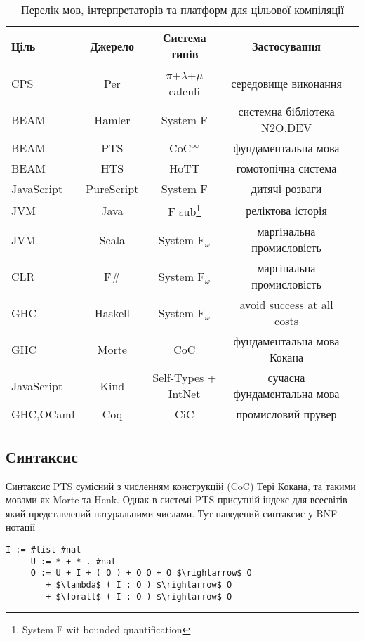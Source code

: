 \begin{table}[h]
\begin{center}
\caption{Перелік мов, інтерпретаторів та платформ для цільової компіляції}
\begin{tabular}{lcccc}
\hline
\textbf{Ціль} & \textbf{Джерело} & \textbf{Система типів} & \textbf{Застосування}\\
\hline
\rowcolor{LightGray}
CPS        & Per      & $\pi$+$\lambda$+$\mu$ calculi & середовище виконання \\
\rowcolor{LightGray}
BEAM       & Hamler     & System F            & системна бібліотека N2O.DEV \\
\rowcolor{LightGray}
BEAM       & PTS        & CoC$^\infty$        & фундаментальна мова \\
\rowcolor{LightGray}
BEAM       & HTS        & HoTT                & гомотопічна система \\
\hline
JavaScript & PureScript & System F & дитячі розваги \\
JVM        & Java       & F-sub\footnote{System F wit bounded quantification} & реліктова історія \\
JVM        & Scala      & System F$_\omega$   & маргінальна промисловість \\
CLR        & F\#        & System F$_\omega$   & маргінальна промисловість \\
GHC        & Haskell    & System F$_\omega$   & avoid success at all costs \\
GHC        & Morte      & CoC                 & фундаментальна мова Кокана \\
JavaScript & Kind       & Self-Types + IntNet & сучасна фундаментальна мова \\
GHC,OCaml  & Coq        & CiC                 & промисловий прувер \\
\hline
\end{tabular}
\end{center}
\end{table}

\subsection{Синтаксис}
Синтаксис PTS сумісний з численням конструкцій (CoC) Тері Кокана,
та такими мовами як Morte та Henk.
Однак в системі PTS присутній індекс для всесвітів який
представлений натуральними числами. Тут наведений синтаксис у BNF нотації

\begin{lstlisting}[mathescape=true]
     I := #list #nat
     U := * + * . #nat
     O := U + I + ( O ) + O O + O $\rightarrow$ O
        + $\lambda$ ( I : O ) $\rightarrow$ O
        + $\forall$ ( I : O ) $\rightarrow$ O
\end{lstlisting}

